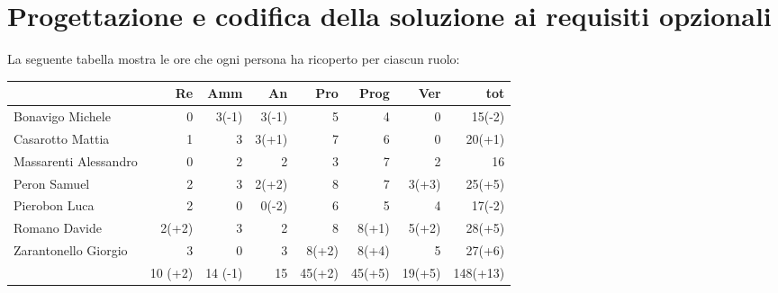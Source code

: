 \section{Progettazione e codifica della soluzione ai requisiti opzionali}

La seguente tabella mostra le ore che ogni persona ha ricoperto per ciascun ruolo:
\begin{table}[ht]
    \begin{tabularx}{\linewidth}{X|rrrrrrr}
    \rowcolor{gray!30}& Re & Amm & An & Pro & Prog & Ver & tot \\
    \hline
    Bonavigo Michele                        & 0        & 3(-1)      & 3(-1)        & 5          & 4      & 0        & 15(-2)  \\

    \rowcolor{gray!10}Casarotto Mattia      & 1        & 3          & 3(+1)        & 7          & 6      & 0        & 20(+1) \\

    Massarenti Alessandro                   & 0        & 2          & 2            & 3          & 7      & 2        & 16 \\ 

    \rowcolor{gray!10}Peron Samuel          & 2        & 3          & 2(+2)        & 8          & 7      & 3(+3)    & 25(+5)  \\ 

    Pierobon Luca                           & 2        & 0          & 0(-2)        & 6          & 5      & 4        & 17(-2) \\ 

    \rowcolor{gray!10}Romano Davide         & 2(+2)    & 3          & 2            & 8          & 8(+1)  & 5(+2)    & 28(+5)\\

    Zarantonello Giorgio                    & 3        & 0          & 3            & 8(+2)      & 8(+4)  & 5        & 27(+6)\\

    \hline                                  & 10 (+2)  & 14 (-1)    & 15           & 45(+2)     & 45(+5) & 19(+5)   & 148(+13)\\  
    \end{tabularx}
\end{table}

